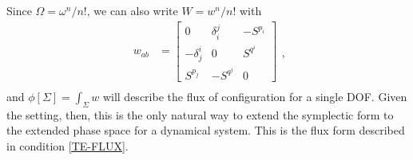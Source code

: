 \documentclass[12pt]{article}
\begin{document}
Since $\Omega = \omega^n/n!$, we can also write $W = w^n/n!$ with
\begin{equation}
    \begin{aligned}
    w_{ab} &=
        \begin{bmatrix}
            0 & \delta_i^j & -S^{p_i} \\
            -\delta_j^i & 0 & S^{q^i} \\
            S^{p_j} & -S^{q^j} & 0
        \end{bmatrix} \\
    \end{aligned},
\end{equation}
and $\phi[\Sigma] = \int_{\Sigma} w$ will describe the flux of configuration for a single DOF. Given the setting, then, this is the only natural way to extend the symplectic form to the extended phase space for a dynamical system. This is the flux form described in condition \ref{TE-FLUX}.
\end{document}
